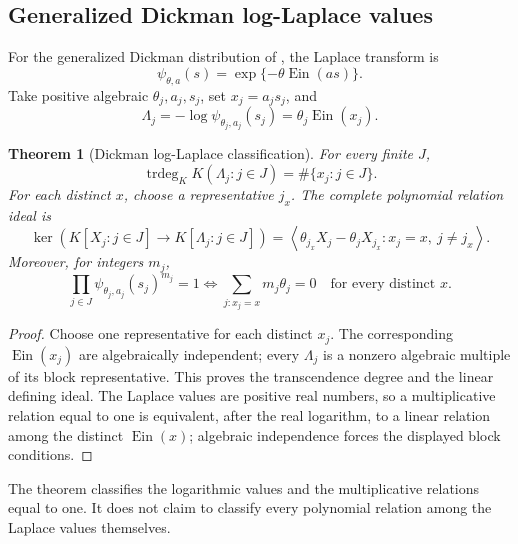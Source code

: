 \documentclass[11pt]{article}
\newtheorem{theorem}{Theorem}[section]
\theoremstyle{definition}
\theoremstyle{remark}
\newcommand{\Ein}{\operatorname{Ein}}
\newcommand{\trdeg}{\operatorname{trdeg}}
\begin{document}
\subsection*{Generalized Dickman log-Laplace values}

For the generalized Dickman distribution of
\cite{GrahovacEtAl2024}, the Laplace transform is
\begin{equation}\label{eq:Dickman-Laplace}
 \psi_{\theta,a}(s)=\exp\{-\theta\Ein(as)\}.
\end{equation}
Take positive algebraic \(\theta_j,a_j,s_j\), set \(x_j=a_js_j\), and
\[
 \Lambda_j=-\log\psi_{\theta_j,a_j}(s_j)=\theta_j\Ein(x_j).
\]

\begin{theorem}[Dickman log-Laplace classification]
\label{thm:Dickman-classification}
For every finite \(J\),
\begin{equation}\label{eq:Dickman-trdeg}
 \boxed{\displaystyle
 \trdeg_KK(\Lambda_j:j\in J)=\#\{x_j:j\in J\}.}
\end{equation}
For each distinct \(x\), choose a representative \(j_x\).  The complete
polynomial relation ideal is
\begin{equation}\label{eq:Dickman-relation-ideal}
 \ker\!\left(K[X_j:j\in J]\to K[\Lambda_j:j\in J]\right)
 =
 \left\langle
 \theta_{j_x}X_j-\theta_jX_{j_x}:
 x_j=x,\ j\ne j_x
 \right\rangle.
\end{equation}
Moreover,
for integers \(m_j\),
\begin{equation}\label{eq:Dickman-multiplicative}
 \boxed{\displaystyle
 \prod_{j\in J}\psi_{\theta_j,a_j}(s_j)^{m_j}=1
 \Longleftrightarrow
 \sum_{j:x_j=x}m_j\theta_j=0
 \quad\text{for every distinct }x.}
\end{equation}
\end{theorem}

\begin{proof}
Choose one representative for each distinct \(x_j\).  The corresponding
\(\Ein(x_j)\) are algebraically independent; every \(\Lambda_j\) is a nonzero
algebraic multiple of its block representative.  This proves the
transcendence degree and the linear defining ideal.  The Laplace values are
positive real numbers, so a multiplicative relation equal to one is
equivalent, after the real logarithm, to a linear relation among the
distinct \(\Ein(x)\); algebraic independence forces the displayed block
conditions.
\end{proof}

The theorem classifies the logarithmic values and the multiplicative
relations equal to one.  It does not claim to classify every polynomial
relation among the Laplace values themselves.
\end{document}

